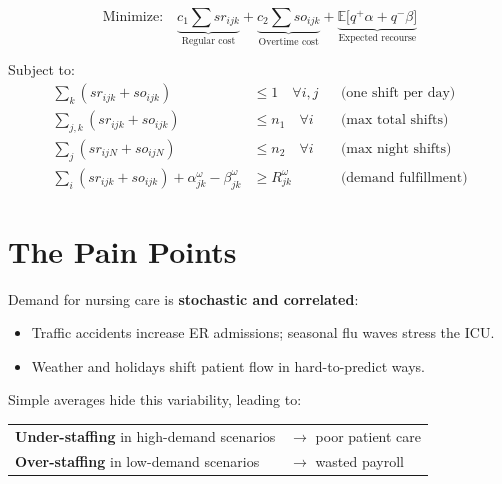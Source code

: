 \documentclass[12pt,a4paper]{article}
\begin{document}
\begin{eqbox}
\begin{equation}
\text{Minimize:}\quad
\underbrace{c_1 \textstyle\sum sr_{ijk}}_{\text{Regular cost}}
+\underbrace{c_2 \textstyle\sum so_{ijk}}_{\text{Overtime cost}}
+\underbrace{\mathbb{E}\bigl[q^{+}\alpha + q^{-}\beta\bigr]}_{\text{Expected recourse}}
\end{equation}
\end{eqbox}

\noindent Subject to:
\begin{align}
  \sum_k (sr_{ijk}+so_{ijk}) &\leq 1 \quad \forall i,j
    && \text{(one shift per day)}\\
  \sum_{j,k}(sr_{ijk}+so_{ijk}) &\leq n_1 \quad \forall i
    && \text{(max total shifts)}\\
  \sum_j(sr_{ijN}+so_{ijN}) &\leq n_2 \quad \forall i
    && \text{(max night shifts)}\\
  \sum_i(sr_{ijk}+so_{ijk}) + \alpha_{jk}^{\omega} - \beta_{jk}^{\omega}
    &\geq R_{jk}^{\omega}
    && \text{(demand fulfillment)}
\end{align}

\newpage
\section{The Pain Points}

\begin{problembox}
Demand for nursing care is \textbf{stochastic and correlated}:
\begin{itemize}[itemsep=2pt]
  \item Traffic accidents increase ER admissions; seasonal flu waves stress the ICU.
  \item Weather and holidays shift patient flow in hard-to-predict ways.
\end{itemize}
Simple averages hide this variability, leading to:\\[4pt]
\begin{tabular}{@{}ll@{}}
  \textcolor{accentred}{\textbf{Under-staffing}} in high-demand scenarios & $\rightarrow$ poor patient care\\
  \textcolor{accentorange}{\textbf{Over-staffing}} in low-demand scenarios & $\rightarrow$ wasted payroll
\end{tabular}
\end{problembox}
\end{document}
